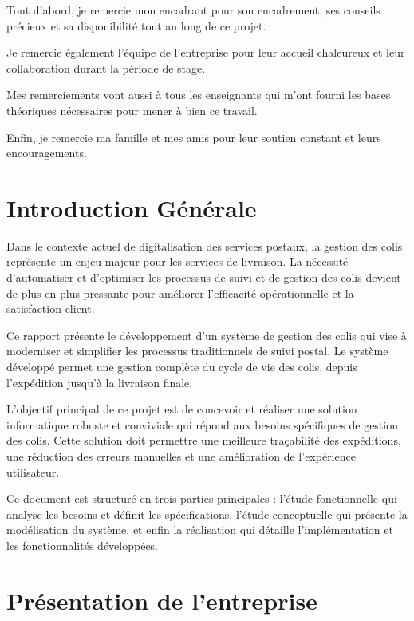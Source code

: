 \documentclass[12pt,a4paper]{report}
\begin{document}
Tout d'abord, je remercie mon encadrant pour son encadrement, ses conseils précieux et sa disponibilité tout au long de ce projet.

Je remercie également l'équipe de l'entreprise pour leur accueil chaleureux et leur collaboration durant la période de stage.

Mes remerciements vont aussi à tous les enseignants qui m'ont fourni les bases théoriques nécessaires pour mener à bien ce travail.

Enfin, je remercie ma famille et mes amis pour leur soutien constant et leurs encouragements.

\newpage

\chapter*{Introduction Générale}

Dans le contexte actuel de digitalisation des services postaux, la gestion des colis représente un enjeu majeur pour les services de livraison. La nécessité d'automatiser et d'optimiser les processus de suivi et de gestion des colis devient de plus en plus pressante pour améliorer l'efficacité opérationnelle et la satisfaction client.

Ce rapport présente le développement d'un système de gestion des colis qui vise à moderniser et simplifier les processus traditionnels de suivi postal. Le système développé permet une gestion complète du cycle de vie des colis, depuis l'expédition jusqu'à la livraison finale.

L'objectif principal de ce projet est de concevoir et réaliser une solution informatique robuste et conviviale qui répond aux besoins spécifiques de gestion des colis. Cette solution doit permettre une meilleure traçabilité des expéditions, une réduction des erreurs manuelles et une amélioration de l'expérience utilisateur.

Ce document est structuré en trois parties principales : l'étude fonctionnelle qui analyse les besoins et définit les spécifications, l'étude conceptuelle qui présente la modélisation du système, et enfin la réalisation qui détaille l'implémentation et les fonctionnalités développées.

\newpage

\chapter*{Présentation de l'entreprise}
\end{document}
